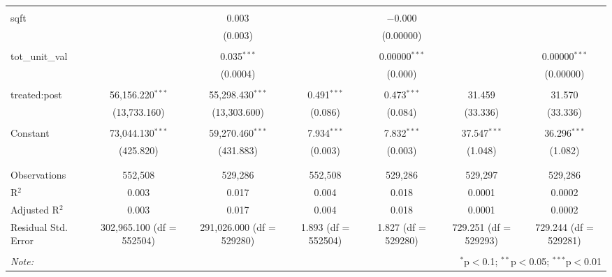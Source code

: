 \begin{table}[H]
{\begin{tabular}{@{\extracolsep{5pt}}lcccccc}
   & & & & & & \\  

  sqft &  & 0.003 &  & $-$0.000 &  &  \\  

   &  & (0.003) &  & (0.00000) &  &  \\  

   & & & & & & \\  

  tot\_unit\_val &  & 0.035$^{***}$ &  & 0.00000$^{***}$ &  & 0.00000$^{***}$ \\  

   &  & (0.0004) &  & (0.000) &  & (0.00000) \\  

   & & & & & & \\  

  treated:post & 56,156.220$^{***}$ & 55,298.430$^{***}$ & 0.491$^{***}$ & 0.473$^{***}$ & 31.459 & 31.570 \\  

   & (13,733.160) & (13,303.600) & (0.086) & (0.084) & (33.336) & (33.336) \\  

   & & & & & & \\  

  Constant & 73,044.130$^{***}$ & 59,270.460$^{***}$ & 7.934$^{***}$ & 7.832$^{***}$ & 37.547$^{***}$ & 36.296$^{***}$ \\  

   & (425.820) & (431.883) & (0.003) & (0.003) & (1.048) & (1.082) \\  

   & & & & & & \\  

 \hline \\[-1.8ex]  

 Observations & 552,508 & 529,286 & 552,508 & 529,286 & 529,297 & 529,286 \\  

 R$^{2}$ & 0.003 & 0.017 & 0.004 & 0.018 & 0.0001 & 0.0002 \\  

 Adjusted R$^{2}$ & 0.003 & 0.017 & 0.004 & 0.018 & 0.0001 & 0.0002 \\  

 Residual Std. Error & 302,965.100 (df = 552504) & 291,026.000 (df = 529280) & 1.893 (df = 552504) & 1.827 (df = 529280) & 729.251 (df = 529293) & 729.244 (df = 529281) \\  

 \hline  

 \hline \\[-1.8ex]  

 \textit{Note:}  & \multicolumn{6}{r}{$^{*}$p$<$0.1; $^{**}$p$<$0.05; $^{***}$p$<$0.01} \\  

 \end{tabular}}  

 \end{table}  

